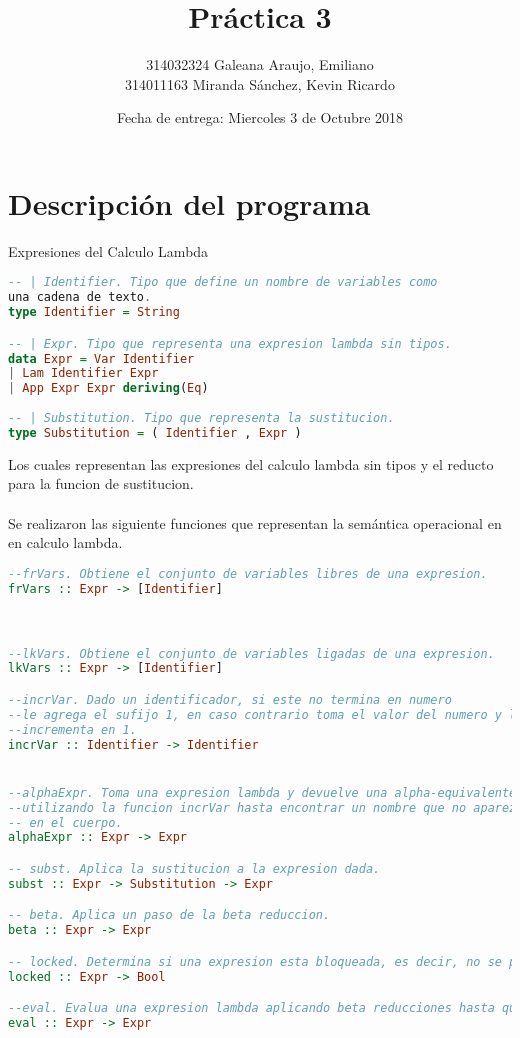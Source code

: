 \documentclass{article}
\title{Práctica 3}
\author{314032324	Galeana Araujo, Emiliano\\
	314011163	Miranda Sánchez, Kevin Ricardo}
\affil{Facultad de Ciencias, UNAM}
\date{Fecha de entrega: Miercoles 3 de Octubre 2018}
\begin{document}
\maketitle

\section{Descripción del programa}
Expresiones del Calculo Lambda
\begin{lstlisting}[language=Haskell]
-- | Identifier. Tipo que define un nombre de variables como 
una cadena de texto.
type Identifier = String

-- | Expr. Tipo que representa una expresion lambda sin tipos.
data Expr = Var Identifier
| Lam Identifier Expr
| App Expr Expr deriving(Eq)
           
-- | Substitution. Tipo que representa la sustitucion.
type Substitution = ( Identifier , Expr )
\end{lstlisting}
Los cuales representan las expresiones del calculo lambda sin tipos y el reducto para la funcion de sustitucion.\\
\\Se realizaron las siguiente funciones que representan la semántica operacional en en calculo lambda.

\begin{lstlisting}[language=Haskell]
--frVars. Obtiene el conjunto de variables libres de una expresion.
frVars :: Expr -> [Identifier]



--lkVars. Obtiene el conjunto de variables ligadas de una expresion.
lkVars :: Expr -> [Identifier]

--incrVar. Dado un identificador, si este no termina en numero
--le agrega el sufijo 1, en caso contrario toma el valor del numero y lo
--incrementa en 1.
incrVar :: Identifier -> Identifier


--alphaExpr. Toma una expresion lambda y devuelve una alpha-equivalente 
--utilizando la funcion incrVar hasta encontrar un nombre que no aparezca
-- en el cuerpo.
alphaExpr :: Expr -> Expr

-- subst. Aplica la sustitucion a la expresion dada.
subst :: Expr -> Substitution -> Expr

-- beta. Aplica un paso de la beta reduccion.
beta :: Expr -> Expr

-- locked. Determina si una expresion esta bloqueada, es decir, no se pueden hacer mas beta reducciones.
locked :: Expr -> Bool

--eval. Evalua una expresion lambda aplicando beta reducciones hasta quedar bloqueada.
eval :: Expr -> Expr



\end{lstlisting}
\end{document}
